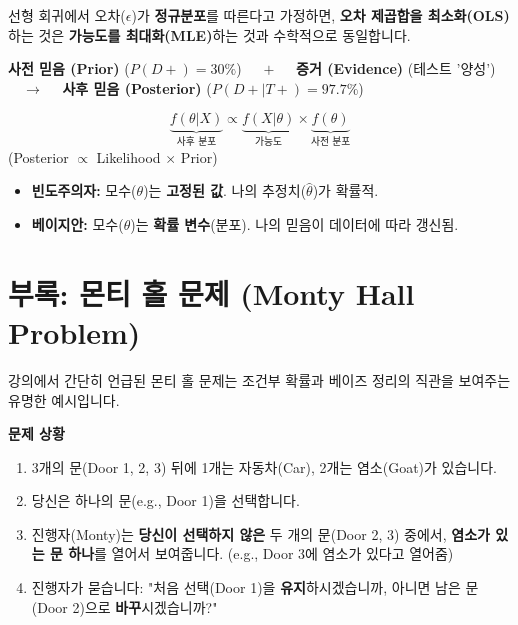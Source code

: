 \documentclass[11pt,a4paper]{book}
\theoremstyle{definition}
\begin{document}
\begin{tcolorbox}[title={OLS = MLE}]
    선형 회귀에서 오차($\epsilon$)가 \textbf{정규분포}를 따른다고 가정하면,
    \textbf{오차 제곱합을 최소화(OLS)}하는 것은
    \textbf{가능도를 최대화(MLE)}하는 것과
    수학적으로 동일합니다.
\end{tcolorbox}

\begin{tcolorbox}[title={베이즈 정리의 핵심 흐름}]
    \textbf{사전 믿음 (Prior)}
    ($P(D+)=30\%$)
    $\quad + \quad$
    \textbf{증거 (Evidence)}
    (테스트 '양성')
    $\quad \to \quad$
    \textbf{사후 믿음 (Posterior)}
    ($P(D+|T+)=97.7\%$)
\end{tcolorbox}

\begin{tcolorbox}[title={베이즈 추론의 심장}]
    $$ \underbrace{f(\theta | X)}_{\text{사후 분포}} \propto \underbrace{f(X | \theta)}_{\text{가능도}} \times \underbrace{f(\theta)}_{\text{사전 분포}} $$
    (Posterior $\propto$ Likelihood $\times$ Prior)
\end{tcolorbox}

\begin{tcolorbox}[title={빈도주의 vs. 베이지안}]
    \begin{itemize}
        \item \textbf{빈도주의자:} 모수($\theta$)는 \textbf{고정된 값}. 나의 추정치($\hat{\theta}$)가 확률적.
        \item \textbf{베이지안:} 모수($\theta$)는 \textbf{확률 변수}(분포). 나의 믿음이 데이터에 따라 갱신됨.
    \end{itemize}
\end{tcolorbox}


\section{부록: 몬티 홀 문제 (Monty Hall Problem)}

강의에서 간단히 언급된 몬티 홀 문제는 조건부 확률과 베이즈 정리의 직관을 보여주는 유명한 예시입니다.

\textbf{문제 상황}
\begin{enumerate}
    \item 3개의 문(Door 1, 2, 3) 뒤에 1개는 자동차(Car), 2개는 염소(Goat)가 있습니다.
    \item 당신은 하나의 문(e.g., Door 1)을 선택합니다.
    \item 진행자(Monty)는 \textbf{당신이 선택하지 않은} 두 개의 문(Door 2, 3) 중에서, \textbf{염소가 있는 문 하나}를 열어서 보여줍니다. (e.g., Door 3에 염소가 있다고 열어줌)
    \item 진행자가 묻습니다: "처음 선택(Door 1)을 \textbf{유지}하시겠습니까, 아니면 남은 문(Door 2)으로 \textbf{바꾸}시겠습니까?"
\end{enumerate}
\end{document}
